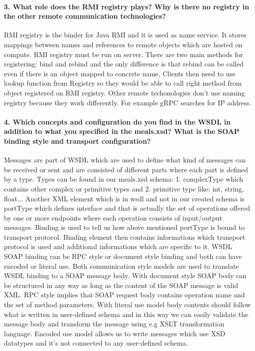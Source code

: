 \documentclass{ds-report}
\begin{document}
	
	
	\paragraph{3. What role does the RMI registry plays? Why is there no registry in the other remote communication technologies? \newline}
	RMI registry is the binder for Java RMI and it is used as name service. It stores mappings between names and references to remote objects which
	are hosted on compute. RMI registry must be run on server. There are two main methods for registering: bind and rebind and the only difference is
	that rebind can be called even if there is an object mapped to concrete name. Clients then need to use lookup function from Registry so they would be
	able to call right method from object registered on RMI registry. Other remote techonologies don't use naming registry because they 
	work differently. For example gRPC searches for IP address.
	
	\paragraph{4. Which concepts and configuration do you find in the WSDL in addition to what you specified in the meals.xsd? What is the SOAP binding style and transport configuration?}
	Messages are part of WSDL which are used to define what kind of messages can
	be received or sent and are consisted of different parts where each part is defined by a type. Types can be found in our meals.xsd schema: 1. complexType which contains other complex or primitive types and 2. primitive type like: int, string, float... Another XML element which is in
	wsdl and not in our created schema is portType which defines interface and that is actually the set of operations offered by one or more endpoints where each operation consists of input/output messages. Binding is used to tell us how above mentioned portType is bound to transport protocol. Binding element then contains informations which transport protocol is used and additional informations which are specific to it. WSDL SOAP binding can be RPC style or document style binding and both can have encoded or literal use. Both communication style models are used to translate WSDL binding to a SOAP message body. With document style SOAP body can be structured in any way as long as the content of the SOAP message is valid XML. RPC style implies that SOAP request body contains operation name and the set of method parameters. With literal use model body contents should follow what is written in user-defined schema and in this way we can easily validate the message body and transform the message using e.g XSLT transformation language. Encoded use model allows us to write messages which use XSD datatypes and it's not connected to any user-defined schema.
	
	\clearpage
	
	
\end{document}
